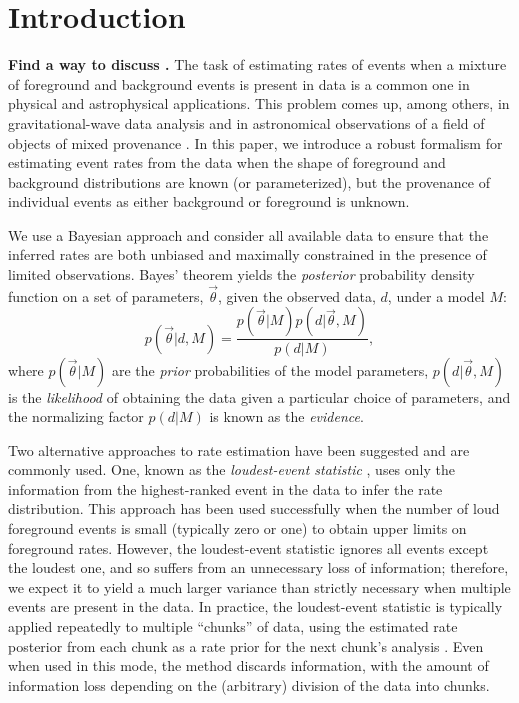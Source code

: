 \documentclass[aps,prd,reprint,nofootinbib]{revtex4-1}
\newcommand{\will}[1]{{\color{blue} \bf #1}}
\begin{document}
\maketitle

\section{Introduction}

\will{Find a way to discuss \cite{Koposov2010}.}  The task of
estimating rates of events when a mixture of foreground and background
events is present in data is a common one in physical and
astrophysical applications.  This problem comes up, among others, in
gravitational-wave data analysis
\cite[e.g.,][]{s5-lowmass,s5-highmass,s5-highmass-erratum,s5-lowmass-2,s6-lowmass,s6-highmass}
and in astronomical observations of a field of objects of mixed
provenance \cite{DeGennaro2009}.  In this paper, we introduce a robust
formalism for estimating event rates from the data when the shape of
foreground and background distributions are known (or parameterized),
but the provenance of individual events as either background or
foreground is unknown.

We use a Bayesian approach and consider all available data to ensure
that the inferred rates are both unbiased and maximally constrained in
the presence of limited observations.  Bayes' theorem yields the
\emph{posterior} probability density function on a set of parameters,
$\vec{\theta}$, given the observed data, $d$, under a model $M$:
\begin{equation}
p(\vec{\theta} | d, M) = \frac{p(\vec{\theta}|M)
  p(d|\vec{\theta},M)}{p(d|M)},
\end{equation}
where $p(\vec{\theta}|M)$ are the \emph{prior} probabilities of the
model parameters, $p(d|\vec{\theta},M)$ is the \emph{likelihood} of
obtaining the data given a particular choice of parameters, and the
normalizing factor $p(d|M)$ is known as the \emph{evidence}.

Two alternative approaches to rate estimation have been suggested and
are commonly used.  One, known as the \emph{loudest-event statistic}
\cite{Biswas2009,Brady2004,Brady2008}, uses only the information from
the highest-ranked event in the data to infer the rate distribution.
This approach has been used successfully
\cite{s5-lowmass,s5-lowmass-2,s5-highmass,s5-highmass-erratum,s6-lowmass,s6-highmass}
when the number of loud foreground events is small (typically zero or
one) to obtain upper limits on foreground rates.  However, the
loudest-event statistic ignores all events except the loudest one, and
so suffers from an unnecessary loss of information; therefore, we
expect it to yield a much larger variance than strictly necessary when
multiple events are present in the data.  In practice, the
loudest-event statistic is typically applied repeatedly to multiple
``chunks'' of data, using the estimated rate posterior from each chunk
as a rate prior for the next chunk's analysis
\cite{s5-lowmass-2,s5-highmass,s5-highmass-erratum}.  Even when used
in this mode, the method discards information, with the amount of
information loss depending on the (arbitrary) division of the data
into chunks.
\end{document}
